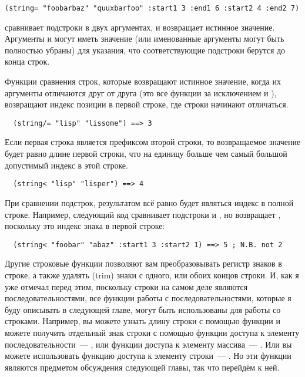 \begin{lstlisting}
(string= "foobarbaz" "quuxbarfoo" :start1 3 :end1 6 :start2 4 :end2 7)
\end{lstlisting}

сравнивает подстроки  в двух аргументах, и возвращает истинное
значение.  Аргументы  и  могут иметь значение
 (или именованные аргументы могут быть полностью убраны) для указания, что
соответствующие подстроки берутся до конца строк.

Функции сравнения строк, которые возвращают истинное значение, когда их аргументы
отличаются друг от друга (это все функции за исключением  и
), возвращают индекс позиции в первой строке, где строки начинают
отличаться.

\begin{lstlisting}
  (string/= "lisp" "lissome") ==> 3
\end{lstlisting}

Если первая строка является префиксом второй строки, то возвращаемое значение будет равно
длине первой строки, что на единицу больше чем самый большой допустимый индекс в этой
строке.

\begin{lstlisting}
  (string< "lisp" "lisper") ==> 4
\end{lstlisting}

При сравнении подстрок, результатом всё равно будет являться индекс в полной строке.
Например, следующий код сравнивает подстроки  и , но возвращает
, поскольку это индекс знака  в первой строке:

\begin{lstlisting}
  (string< "foobar" "abaz" :start1 3 :start2 1) ==> 5 ; N.B. not 2
\end{lstlisting}

Другие строковые функции позволяют вам преобразовывать регистр знаков в строке, а также
удалять (trim) знаки с одного, или обоих концов строки.  И, как я уже отмечал перед этим,
поскольку строки на самом деле являются последовательностями, все функции работы с
последовательностями, которые я буду описывать в следующей главе, могут быть использованы
для работы со строками.  Например, вы можете узнать длину строки с помощью функции
 и можете получить отдельный знак строки с помощью функции доступа к элементу
последовательности~--- , или функции доступа к элементу массива~--- .
Или вы можете использовать функцию доступа к элементу строки~--- .  Но эти
функции являются предметом обсуждения следующей главы, так что перейдём к ней.

